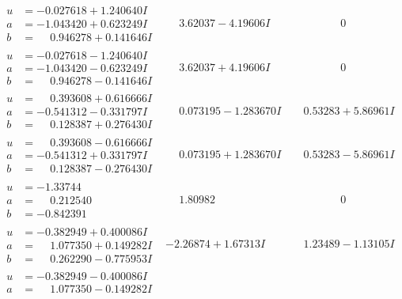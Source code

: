 \documentclass[1p]{elsarticle_modified}
\theoremstyle{definition}
\begin{document}
$$\begin{array}{c|c|c}
\begin{aligned}
u &= -0.027618 + 1.240640 I \\
a &= -1.043420 + 0.623249 I \\
b &= \phantom{-}0.946278 + 0.141646 I\end{aligned}
 & \phantom{-}3.62037 - 4.19606 I & \phantom{-0.000000 } 0 \\ \hline\begin{aligned}
u &= -0.027618 - 1.240640 I \\
a &= -1.043420 - 0.623249 I \\
b &= \phantom{-}0.946278 - 0.141646 I\end{aligned}
 & \phantom{-}3.62037 + 4.19606 I & \phantom{-0.000000 } 0 \\ \hline\begin{aligned}
u &= \phantom{-}0.393608 + 0.616666 I \\
a &= -0.541312 - 0.331797 I \\
b &= \phantom{-}0.128387 + 0.276430 I\end{aligned}
 & \phantom{-}0.073195 - 1.283670 I & \phantom{-}0.53283 + 5.86961 I \\ \hline\begin{aligned}
u &= \phantom{-}0.393608 - 0.616666 I \\
a &= -0.541312 + 0.331797 I \\
b &= \phantom{-}0.128387 - 0.276430 I\end{aligned}
 & \phantom{-}0.073195 + 1.283670 I & \phantom{-}0.53283 - 5.86961 I \\ \hline\begin{aligned}
u &= -1.33744\phantom{ +0.000000I} \\
a &= \phantom{-}0.212540\phantom{ +0.000000I} \\
b &= -0.842391\phantom{ +0.000000I}\end{aligned}
 & \phantom{-}1.80982\phantom{ +0.000000I} & \phantom{-0.000000 } 0 \\ \hline\begin{aligned}
u &= -0.382949 + 0.400086 I \\
a &= \phantom{-}1.077350 + 0.149282 I \\
b &= \phantom{-}0.262290 - 0.775953 I\end{aligned}
 & -2.26874 + 1.67313 I & \phantom{-}1.23489 - 1.13105 I \\ \hline\begin{aligned}
u &= -0.382949 - 0.400086 I \\
a &= \phantom{-}1.077350 - 0.149282 I \\

\end{aligned}
\end{array}$$
\end{document}
